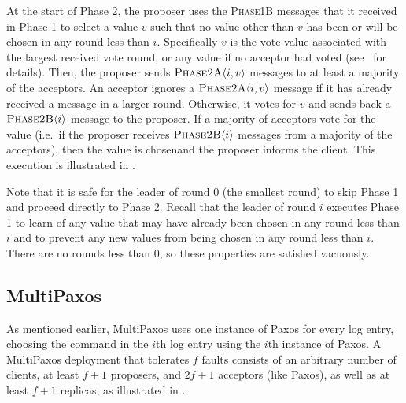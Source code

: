 At the start of Phase 2, the proposer uses the \textsc{Phase1B} messages that
it received in Phase 1 to select a value $v$ such that no value other than $v$
has been or will be chosen in any round less than $i$. Specifically $v$ is the
vote value associated with the largest received vote round, or any value if no
acceptor had voted (see~\cite{lamport2001paxos} for details). Then, the
proposer sends $\textsc{Phase2A}\langle{i, v}\rangle$ messages to at least a majority of the
acceptors. An acceptor ignores a $\textsc{Phase2A}\langle{i, v}\rangle$ message if it has already
received a message in a larger round. Otherwise, it votes for $v$ and sends
back a $\textsc{Phase2B}\langle{i}\rangle$ message to the proposer. If a majority of acceptors vote
for the value (i.e.\ if the proposer receives $\textsc{Phase2B}\langle{i}\rangle$ messages from a
%
majority of the acceptors), then the value is chosenand the proposer informs the
client. This execution is illustrated in .
%

Note that it is safe for the leader of round $0$ (the smallest round) to skip
Phase 1 and proceed directly to Phase 2. Recall that the leader of round $i$
executes Phase 1 to learn of any value that may have already been chosen in any
round less than $i$ and to prevent any new values from being chosen in any
round less than $i$. There are no rounds less than $0$, so these properties are
satisfied vacuously.

\subsection{MultiPaxos}
As mentioned earlier, MultiPaxos uses one instance of Paxos for every log
entry, choosing the command in the $i$th log entry using the $i$th instance of
Paxos.  A MultiPaxos deployment that tolerates $f$ faults consists of an
arbitrary number of clients, at least $f+1$ proposers, and $2f+1$ acceptors
(like Paxos), as well as at least $f+1$ replicas, as illustrated in
.

